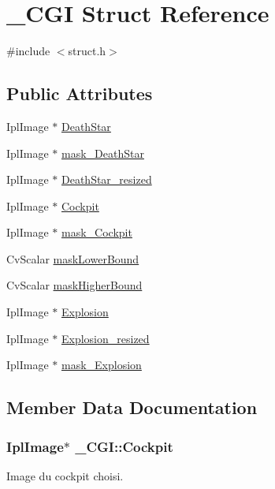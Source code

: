 \hypertarget{struct___c_g_i}{}\section{\+\_\+\+C\+GI Struct Reference}
\label{struct___c_g_i}


{\ttfamily \#include $<$struct.\+h$>$}

\subsection*{Public Attributes}
\begin{DoxyCompactItemize}
\item 
Ipl\+Image $\ast$ \hyperlink{struct___c_g_i_aa1d4c570026afbeb752de156cb115353}{Death\+Star}
\item 
Ipl\+Image $\ast$ \hyperlink{struct___c_g_i_a011dd009bdd05e19be0de580375359f3}{mask\+\_\+\+Death\+Star}
\item 
Ipl\+Image $\ast$ \hyperlink{struct___c_g_i_af452815aee153641ee47cd414ff40084}{Death\+Star\+\_\+resized}
\item 
Ipl\+Image $\ast$ \hyperlink{struct___c_g_i_ae6c60f83ec0f3b929305b4264928fc79}{Cockpit}
\item 
Ipl\+Image $\ast$ \hyperlink{struct___c_g_i_abdbc066c115db2c77957e1b1cd51a996}{mask\+\_\+\+Cockpit}
\item 
Cv\+Scalar \hyperlink{struct___c_g_i_a60c70aa60004326fe459e59d4e3aff5f}{mask\+Lower\+Bound}
\item 
Cv\+Scalar \hyperlink{struct___c_g_i_a7f03cda71a036dd30d70e957feee7a1c}{mask\+Higher\+Bound}
\item 
Ipl\+Image $\ast$ \hyperlink{struct___c_g_i_a8512e1bcfb9f357ebad1faf094229032}{Explosion}
\item 
Ipl\+Image $\ast$ \hyperlink{struct___c_g_i_ab35e9d17dbad69caeecb0d0eb448870c}{Explosion\+\_\+resized}
\item 
Ipl\+Image $\ast$ \hyperlink{struct___c_g_i_ae134831216d4e19fd26f578b5e720066}{mask\+\_\+\+Explosion}
\end{DoxyCompactItemize}


\subsection{Member Data Documentation}
\subsubsection[{\texorpdfstring{Cockpit}{Cockpit}}]{\setlength{\rightskip}{0pt plus 5cm}Ipl\+Image$\ast$ \+\_\+\+C\+G\+I\+::\+Cockpit}\hypertarget{struct___c_g_i_ae6c60f83ec0f3b929305b4264928fc79}{}\label{struct___c_g_i_ae6c60f83ec0f3b929305b4264928fc79}
Image du cockpit choisi. 

